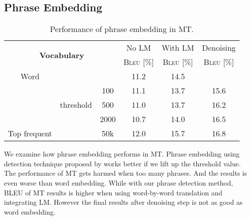 \subsection{Phrase Embedding}

\begin{table}[h]
	\centering
	\begin{tabular}{ccccc  c}
		\hline
		\multicolumn{3}{c}{\multirow{2}{*}{\textbf{Vocabulary}}}                  & No LM & With LM & Denoising \\
		\multicolumn{3}{c}{}                                         &  \textsc{Bleu} [\%]  &  \textsc{Bleu} [\%] & \textsc{Bleu} [\%]   \\ \hline
		Word            & \multicolumn{2}{l}{}              & 11.2 & 14.5  &\leavevmode\color{blue}{ 17.2} \\
		\hline
		\multirow{3}{*}{\cite{mikolov2013distributed} } & \multirow{3}{*}{threshold} & 100  & 11.1 & 13.7  & 15.6 \\ \cline{3-6} 
		&                            & 500  & 11.0 & 13.7  & 16.2 \\ \cline{3-6} 
		&                            & 2000 & 10.7 & 14.0  &16.5 \\ \hline
		Top frequent              & \multicolumn{1}{l}{\text{count}}  & 50k  & \leavevmode\color{blue}12.0 & \leavevmode\color{blue}15.7  & 16.8 \\ \hline
	\end{tabular}
	\caption{Performance of phrase embedding in MT.}
\end{table}
We examine how phrase embedding performs in MT. Phrase embedding using detection technique proposed by \cite{mikolov2013distributed} works better if we lift up the threshold value. The performance of MT gets harmed when too many phrases. And the results is even worse than word embedding.  While with our phrase detection method, BLEU of MT results is higher when using word-by-word translation and integrating LM. However the final results after denoising step is not as good as word embedding. 


